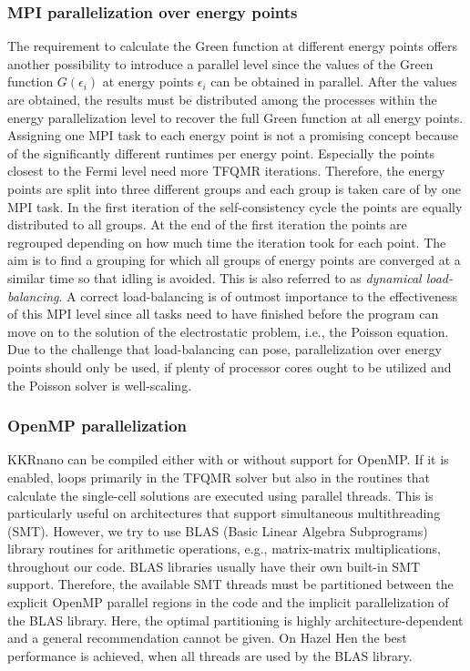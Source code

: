 \documentclass[graybox]{svmult}
\begin{document}
\subsubsection*{MPI parallelization over energy points}

The requirement to calculate the Green function at different energy points offers another possibility to
introduce a parallel level since the values of the Green function $G(\epsilon_i)$ at energy points $\epsilon_i$
can be obtained in parallel.
After the values are obtained, the results must be distributed among the processes within
the energy parallelization level to recover the full Green function at all energy points.
Assigning one MPI task to each energy point is not a promising concept because
of the significantly different runtimes per energy point. Especially the points closest to the
Fermi level 
need more TFQMR iterations.
Therefore, the energy points are split into three different groups and each group is taken care of by
one MPI task.
In the first iteration of the self-consistency cycle the points are equally distributed to all
groups. At the end of the first iteration the points are regrouped depending on how much time the iteration took
for each point. The aim is to find a grouping for which all groups of energy points are converged at
a similar time so that idling is avoided. This is also referred to as \textit{dynamical load-balancing}.
A correct load-balancing is of outmost importance to the effectiveness of this MPI level since
all tasks need to have finished before the program can move on to the solution of the electrostatic problem,
i.e., the Poisson equation.
Due to the challenge that load-balancing can pose, parallelization over energy points should only be used, 
if plenty of processor cores
ought to be utilized and the Poisson solver is well-scaling.

\subsubsection*{OpenMP parallelization}

KKRnano can be compiled either with or without support for OpenMP.
If it is enabled,
loops primarily in the TFQMR solver but also in the routines that calculate the single-cell
solutions are executed using parallel threads. 
This is particularly useful on architectures that support simultaneous multithreading (SMT).
However, we try to use BLAS (Basic Linear Algebra Subprograms) library routines for arithmetic
operations, e.g., matrix-matrix multiplications, throughout our code. BLAS libraries usually
have their own built-in SMT support.
Therefore, the available SMT threads must be partitioned between the explicit OpenMP 
parallel regions in the code and the implicit parallelization of the BLAS library.
Here, the optimal partitioning is highly architecture-dependent and a general recommendation cannot
be given. On Hazel Hen the best performance is achieved, when all threads are used by the BLAS library.
\end{document}
